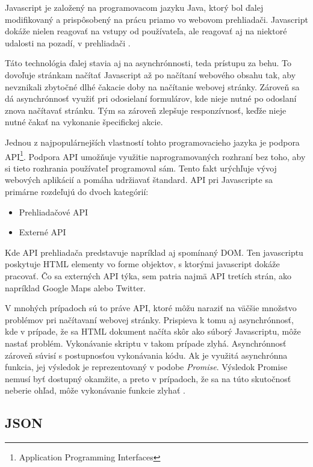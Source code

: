 \bigskip

Javascript je založený na programovacom jazyku Java, ktorý bol ďalej modifikovaný a prispôsobený na prácu priamo vo webovom prehliadači. Javascript dokáže nielen reagovať na vstupy od používateľa, ale reagovať aj na niektoré udalosti na pozadí, v prehliadači \cite{Javascript}. 

Táto technológia ďalej stavia aj na asynchrónnosti, teda prístupu za behu. To dovoľuje stránkam načítať Javascript až po načítaní webového obsahu tak, aby nevznikali zbytočné dlhé čakacie doby na načítanie webovej stránky. Zároveň sa dá asynchrónnosť využiť pri odosielaní formulárov, kde nieje nutné po odoslaní znova načítavať stránku. Tým sa zároveň zlepšuje responzívnosť, keďže nieje nutné čakať na vykonanie špecifickej akcie. 

Jednou z najpopulárnejších vlastností tohto programovacieho jazyka je podpora API\footnote{Application Programming Interfaces}. Podpora API umožňuje využitie naprogramovaných rozhraní bez toho, aby si tieto rozhrania používateľ programoval sám. Tento fakt urýchľuje vývoj webových aplikácií a pomáha udržiavať štandard. API pri Javascripte sa primárne rozdeľujú do dvoch kategórií:

\begin{itemize}
    \item {Prehliadačové API}
    \item {Externé API}
\end{itemize}

Kde API prehliadača predstavuje napríklad aj spomínaný DOM. Ten javascriptu poskytuje HTML elementy vo forme objektov, s ktorými javascript dokáže pracovať. Čo sa externých API týka, sem patria najmä API tretích strán, ako napríklad Google Maps alebo Twitter.

V mnohých prípadoch sú to práve API, ktoré môžu naraziť na väčšie množstvo problémov pri načítavaní webovej stránky. Prispieva k tomu aj asynchrónnosť, kde v prípade, že sa HTML dokument načíta skôr ako súborý Javascriptu, môže nastať problém. Vykonávanie skriptu v takom prípade zlyhá. Asynchrónnosť zároveň súvisí s postupnosťou vykonávania kódu. Ak je využitá asynchrónna funkcia, jej výsledok je reprezentovaný v podobe \textit{Promise}. Výsledok Promise nemusí byť dostupný okamžite, a preto v prípadoch, že sa na túto skutočnosť neberie ohľad, môže vykonávanie funkcie zlyhať \cite{Javascript}.

\newpage
\subsection{JSON}


